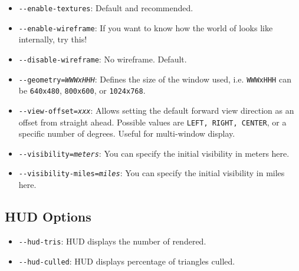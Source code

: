 \begin{itemize}
\item{\texttt{-$ $-enable-textures}}: Default and recommended.
\item{\texttt{-$ $-enable-wireframe}}: If you want to know how the world of \FlightGear{} looks like internally, try
this!
\item{\texttt{-$ $-disable-wireframe}}: No wireframe. Default.
\item{\texttt{-$ $-geometry={\it WWWxHHH}}}: Defines the size of the window used, i.e.
\texttt{WWWxHHH} can be \texttt{640x480}, \texttt{800x600}, or
\texttt{1024x768}.
\item{\texttt{-$ $-view-offset={\it xxx}}}: Allows setting the default forward view direction as an offset from straight
ahead. Possible values are \texttt{LEFT, RIGHT, CENTER}, or a specific number of degrees.
Useful for multi-window display.
\item{\texttt{-$ $-visibility={\it meters}}}: You can specify the initial visibility in meters here.
\item{\texttt{-$ $-visibility-miles={\it miles}}}: You can specify the initial visibility in miles here.
\end{itemize}

\subsection{HUD Options}
\begin{itemize}
\item{\texttt{-$ $-hud-tris}}: HUD displays the number of  rendered.
\item{\texttt{-$ $-hud-culled}}: HUD displays percentage of triangles culled.
\end{itemize}

